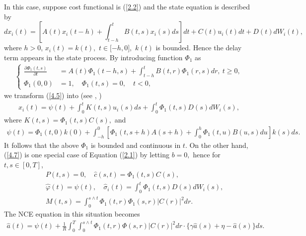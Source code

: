 \documentclass[11pt]{article}
\def\dsp{\displaystyle}
\begin{document}
In this case, suppose cost functional is (\ref{2.2}) and the state equation is described by%
%
\begin{equation}\label{4.5}
dx_{i}(t)=\left[A(t)x_{i}(t-h)+\int_{t-h}^{t}B(t,s)x_{i}(s)ds\right]dt+C(t)u_{i}(t)dt+D(t)dW_i(t),
\end{equation}
%
where $h>0$, $x_{i}(t)=k(t),$ $t\in \lbrack -h,0],$ $k(t)$ is
bounded. Hence the delay term
appears in the state process. By introducing function $\Phi_1 $ as%
%
\begin{eqnarray}\label{4.6}
\left\{\begin{array}{rl} \dsp\frac{\partial \Phi_1(t,s)}{\partial t}
& = \dsp A(t)\Phi_1(t-h,s)+\int_{t-h}^{t}B(t,r)\Phi_1(r,s)dr,\ t\geq
0, \\ [5mm] \Phi_1(0,0) & = 1, \quad \Phi_1(t,s)=0, \quad t<0,
\end{array}\right.
\end{eqnarray}%
we transform (\ref{4.5}) into (see \cite{L 1973}, \cite{O-Z
2010})
\begin{eqnarray}\label{4.7}
x_{i}(t)=\psi(t)+\int_{0}^{t}K(t,s)u_i(s)ds+\int_{0}^{t}\Phi_1
(t,s)D(s)dW_i(s),
\end{eqnarray}%
where $K(t,s)=\Phi_1(t,s)C(s),$ and
%
\begin{eqnarray*}
\psi(t)=\Phi_1(t,0)k(0)+\int_{-h}^{0}\left[ \Phi_1
(t,s+h)A(s+h)+\int_{0}^{h}\Phi_1(t,u)B(u,s)du\right] k(s)ds .
\end{eqnarray*}%
It follows that the above $\Phi_1$ is bounded and continuous in
$t$. On the other hand, (\ref{4.7}) is one special case of Equation (\ref{2.1}) by letting $b=0,$ hence for $t,s\in[0,T]$,
%
\begin{eqnarray*}
& & P(t,s) = 0, \quad \widehat{c}(s,t)=\Phi_1(t,s)C(s), \\
& & \widehat{\varphi }(t) = \psi(t), \quad \widehat{\sigma}_{i}(t)=\int_{0}^{t}\Phi_1(t,s)D(s)dW_{i}(s),\\
& & M(t,s) = \int_{0}^{s\wedge t}\Phi_1(t,r)\Phi_1(s,r)|C(r)|^{2}dr.
\end{eqnarray*}
%
The NCE equation in this situation becomes
%
\begin{eqnarray}\label{4.8}
\widehat{a}(t)=\psi(t)+\frac{1}{R}\int_{0}^{T}\int_{0}^{s\wedge
t}\Phi_1(t,r)\Phi(s,r)|C(r)|^{2}dr\cdot\big\{\gamma
\widehat{a}(s)+\eta-\widehat{a}(s)\big\}ds.
\end{eqnarray}
%
\end{document}
